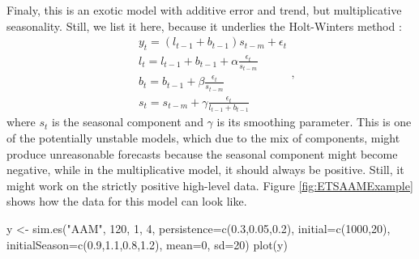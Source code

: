 \documentclass[
]{book}
\newenvironment{Shaded}{\begin{snugshade}}{\end{snugshade}}
\newcommand{\AttributeTok}[1]{\textcolor[rgb]{0.77,0.63,0.00}{#1}}
\newcommand{\DecValTok}[1]{\textcolor[rgb]{0.00,0.00,0.81}{#1}}
\newcommand{\FloatTok}[1]{\textcolor[rgb]{0.00,0.00,0.81}{#1}}
\newcommand{\FunctionTok}[1]{\textcolor[rgb]{0.00,0.00,0.00}{#1}}
\newcommand{\NormalTok}[1]{#1}
\newcommand{\OtherTok}[1]{\textcolor[rgb]{0.56,0.35,0.01}{#1}}
\newcommand{\StringTok}[1]{\textcolor[rgb]{0.31,0.60,0.02}{#1}}
\theoremstyle{definition}
\theoremstyle{definition}
\theoremstyle{definition}
\theoremstyle{definition}
\theoremstyle{remark}
\begin{document}
Finaly, this is an exotic model with additive error and trend, but multiplicative seasonality. Still, we list it here, because it underlies the Holt-Winters method \citep{Winters1960}:
\begin{equation}
  \begin{aligned}
    & y_{t} = (l_{t-1} + b_{t-1}) s_{t-m} + \epsilon_t \\
    & l_t = l_{t-1} + b_{t-1} + \alpha \frac{\epsilon_t}{s_{t-m}} \\
    & b_t = b_{t-1} + \beta \frac{\epsilon_t}{s_{t-m}} \\
    & s_t = s_{t-m} + \gamma \frac{\epsilon_t}{l_{t-1}+b_{t-1}}
  \end{aligned} ,
  \label{eq:ETSAAM}
\end{equation}
where \(s_t\) is the seasonal component and \(\gamma\) is its smoothing parameter. This is one of the potentially unstable models, which due to the mix of components, might produce unreasonable forecasts because the seasonal component might become negative, while in the multiplicative model, it should always be positive. Still, it might work on the strictly positive high-level data. Figure \ref{fig:ETSAAMExample} shows how the data for this model can look like.

\begin{Shaded}
\begin{Highlighting}[]
\NormalTok{y }\OtherTok{\textless{}{-}} \FunctionTok{sim.es}\NormalTok{(}\StringTok{"AAM"}\NormalTok{, }\DecValTok{120}\NormalTok{, }\DecValTok{1}\NormalTok{, }\DecValTok{4}\NormalTok{, }\AttributeTok{persistence=}\FunctionTok{c}\NormalTok{(}\FloatTok{0.3}\NormalTok{,}\FloatTok{0.05}\NormalTok{,}\FloatTok{0.2}\NormalTok{),}
            \AttributeTok{initial=}\FunctionTok{c}\NormalTok{(}\DecValTok{1000}\NormalTok{,}\DecValTok{20}\NormalTok{), }\AttributeTok{initialSeason=}\FunctionTok{c}\NormalTok{(}\FloatTok{0.9}\NormalTok{,}\FloatTok{1.1}\NormalTok{,}\FloatTok{0.8}\NormalTok{,}\FloatTok{1.2}\NormalTok{),}
            \AttributeTok{mean=}\DecValTok{0}\NormalTok{, }\AttributeTok{sd=}\DecValTok{20}\NormalTok{)}
\FunctionTok{plot}\NormalTok{(y)}
\end{Highlighting}
\end{Shaded}
\end{document}

